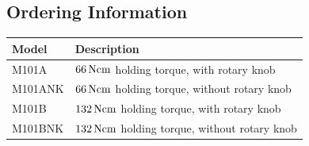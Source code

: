 \documentclass[a4paper, final, 12pt, oneside]{scrartcl}
\numberwithin{equation}{section}
\numberwithin{table}{section}
\numberwithin{figure}{section}
\begin{document}
\subsection*{Ordering Information}
\begin{table}[!hp]
  \begin{tabular}{ll}
    \toprule
    \textbf{Model} & \textbf{Description}\\
    \midrule
    M101A   & $\unit[66]{Ncm}$ holding torque, with rotary knob \\
    M101ANK & $\unit[66]{Ncm}$ holding torque, without rotary knob \\
    M101B   & $\unit[132]{Ncm}$ holding torque, with rotary knob \\
    M101BNK & $\unit[132]{Ncm}$ holding torque, without rotary knob \\
    \bottomrule
  \end{tabular}
\end{table}















\FloatBarrier
\vfill
\end{document}
